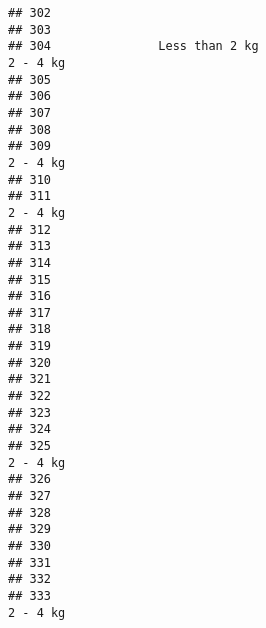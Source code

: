 \documentclass[
]{article}
\begin{document}
\begin{verbatim}
## 302                                                                            
## 303                                                                            
## 304               Less than 2 kg                                       2 - 4 kg
## 305                                                                            
## 306                                                                            
## 307                                                                            
## 308                                                                            
## 309                                                                    2 - 4 kg
## 310                                                                            
## 311                                                                    2 - 4 kg
## 312                                                                            
## 313                                                                            
## 314                                                                            
## 315                                                                            
## 316                                                                            
## 317                                                                            
## 318                                                                            
## 319                                                                            
## 320                                                                            
## 321                                                                            
## 322                                                                            
## 323                                                                            
## 324                                                                            
## 325                                                                    2 - 4 kg
## 326                                                                            
## 327                                                                            
## 328                                                                            
## 329                                                                            
## 330                                                                            
## 331                                                                            
## 332                                                                            
## 333                                                                    2 - 4 kg

\end{verbatim}
\end{document}
